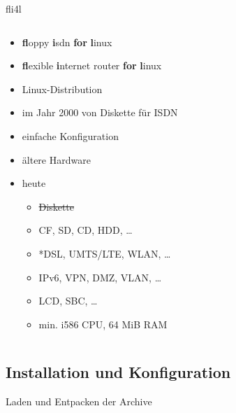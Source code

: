 \documentclass[t]{beamer}
\makeatletter
\newcommand{\soutthick}[1]{%
    \renewcommand{\ULthickness}{1pt}%
        \sout{#1}%
    \renewcommand{\ULthickness}{.4pt}%
}
\newcommand{\strong}[1]{\@strong{#1}}
\newcommand{\@@strong}[1]{\textbf{\let\@strong\@@@strong#1}}
\newcommand{\@@@strong}[1]{\textnormal{\let\@strong\@@strong#1}}
\let\@strong\@@strong
\makeatother
\begin{document}
\begin{frame}{fli4l}
    \begin{columns}[T,onlytextwidth]
        \begin{column}{0.6\textwidth}
            \begin{itemize}
                \item \strong{fl}oppy \strong{i}sdn \strong{for} \strong{l}inux
                \item \strong{fl}exible \strong{i}nternet router \strong{for}
                    \strong {l}inux
                \item<2-> Linux-Distribution
                \item<2-> im Jahr 2000 von Diskette für ISDN
                \item<2-> einfache Konfiguration
                \item<2-> ältere Hardware
                \item<3-> heute
                    \begin{itemize}
                        \item \soutthick{Diskette}
                        \item CF, SD, CD, HDD, …
                        \item *DSL, UMTS/LTE, WLAN, …
                        \item IPv6, VPN, DMZ, VLAN, …
                        \item LCD, SBC, …
                        \item min. i586 CPU, 64 MiB RAM
                    \end{itemize}
            \end{itemize}
        \end{column}
        \begin{column}{0.37\textwidth}
            \begin{figure}
                
            \end{figure}
        \end{column}
    \end{columns}
\end{frame}

\subsection{Installation und Konfiguration}

\begin{frame}{Laden und Entpacken der Archive}
    \begin{figure}
    \end{figure}
\end{frame}
\end{document}
